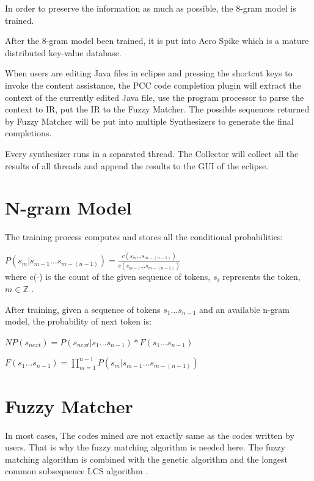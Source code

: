 \documentclass{sig-alternate-05-2015}
\begin{document}
In order to preserve the information as much as possible, the 8-gram model is trained.

After the 8-gram model been trained, it is put into Aero Spike\cite{aerospikedocs} which is a mature distributed key-value database.

When users are editing Java files in eclipse and pressing the shortcut keys to invoke the content assistance, the PCC code completion plugin will extract the context of the currently edited Java file, use the program processor to parse the context to IR, put the IR to the Fuzzy Matcher. The possible sequences returned by Fuzzy Matcher will be put into multiple Synthesizers to generate the final completions.

Every synthesizer runs in a separated thread. The Collector will collect all the results of all threads and append the results to the GUI of the eclipse.

\vspace{-0.1cm}
\section{N-gram Model}

The training process computes and stores all the conditional probabilities:

$P(s_m|s_{m-1}...s_{m-(n-1)}) = \frac{c(s_m...s_{m-(n-1)})}{c(s_{m-1}...s_{m-(n-1)})}$
\\where c($\cdot$) is the count of the given sequence of tokens, $s_i$ represents the token, $m \in \mathbb{Z}$ .

After training, given a sequence of tokens $s_1...s_{n-1}$ and an available n-gram model, the probability of next token is:

$NP(s_{next}) = P(s_{next}|s_1...s_{n-1}) * F(s_1...s_{n-1})$

$F(s_1...s_{n-1}) = \prod_{m=1}^{n-1}P(s_m|s_{m-1}...s_{m-(n-1)})$
\vspace{-0.1cm}

\section{Fuzzy Matcher}

In most cases, The codes mined are not exactly same as the codes written by users. That is why the fuzzy matching algorithm is needed here. The fuzzy matching algorithm is combined with the genetic algorithm \cite{geneticalgorithm} and the longest common subsequence LCS algorithm \cite{introalgorithm}.
\end{document}
